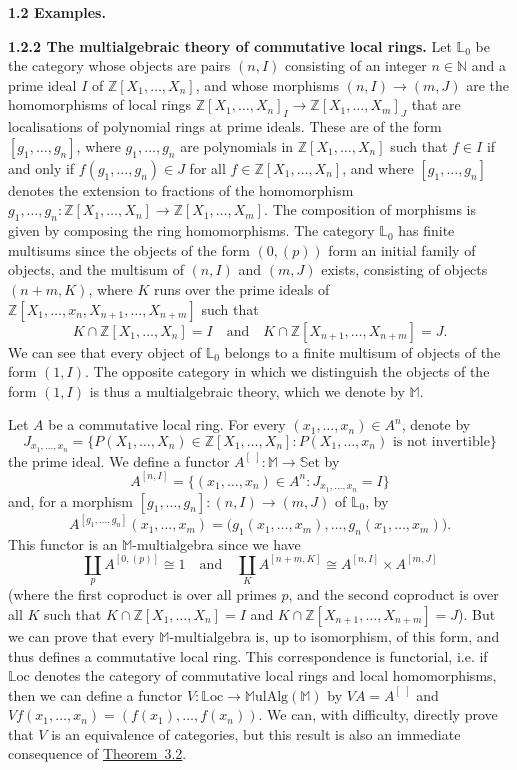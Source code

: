 \documentclass{article}
\newenvironment{rmenv}[1]
  {\phantomsection\par\medskip\noindent\textbf{#1.}\rmfamily}
  {\medskip}
\newcommand{\bb}[1]{{\mathbb{#1}}}
\newcommand{\Set}{\mathbb{S}\mathrm{et}}
\newcommand{\MulAlg}{\mathbb{M}\mathrm{ulAlg}}
\newcommand{\Loc}{\mathbb{L}\mathrm{oc}}
\newcommand{\oldpage}[1]{\marginpar{\footnotesize$\Big\vert$ \textit{p.~#1}}}
\begin{document}
\begin{rmenv}{1.2 Examples}
  \begin{rmenv}{1.2.2 The multialgebraic theory of commutative local rings}
    Let $\bb{L}_0$ be the category whose objects are pairs $(n,I)$ consisting of an integer $n\in\bb{N}$ and a prime ideal $I$ of $\bb{Z}[X_1,\ldots,X_n]$, and whose morphisms $(n,I)\to(m,J)$ are the homomorphisms of local rings $\bb{Z}[X_1,\ldots,X_n]_I\to\bb{Z}[X_1,\ldots,X_m]_J$ that are localisations of polynomial rings at prime ideals.
    These are of the form $[g_1,\ldots,g_n]$, where $g_1,\ldots,g_n$ are polynomials in $\bb{Z}[X_1,\ldots,X_n]$ such that $f\in I$ if and only if $f(g_1,\ldots,g_n)\in J$ for all $f\in\bb{Z}[X_1,\ldots,X_n]$, and where $[g_1,\ldots,g_n]$ denotes the extension to fractions of the homomorphism $g_1,\ldots,g_n\colon\bb{Z}[X_1,\ldots,X_n]\to\bb{Z}[X_1,\ldots,X_m]$.
    The composition of morphisms is given by composing the ring homomorphisms.
    The category $\bb{L}_0$ has finite multisums since the objects of the form $(0,(p))$ form an initial family of objects, and the multisum of $(n,I)$ and $(m,J)$ exists, consisting of objects $(n+m,K)$, where $K$ runs over the prime ideals of $\bb{Z}[X_1,\ldots,x_n,X_{n+1},\ldots,X_{n+m}]$ such that
    \[
      K\cap\bb{Z}[X_1,\ldots,X_n] = I
      \quad\text{and}\quad
      K\cap\bb{Z}[X_{n+1},\ldots,X_{n+m}] = J.
    \]
    We can see that every object of $\bb{L}_0$ belongs to a finite multisum of objects of the form $(1,I)$.
    The opposite category in which we distinguish the objects of the form $(1,I)$ is thus a multialgebraic theory, which we denote by $\bb{M}$.

    Let $A$ be a commutative local ring.
    For every $(x_1,\ldots,x_n)\in A^n$, denote by
    \[
      J_{x_1,\ldots,x_n} =
      \big\{
        P(X_1,\ldots,X_n)\in\bb{Z}[X_1,\ldots,X_n]
        :
        \mbox{$P(X_1,\ldots,x_n)$ is not invertible}
      \big\}
    \]
\oldpage{196}
    the prime ideal.
    We define a functor  $A^{[\,\,]}\colon\bb{M}\to\Set$ by
    \[
      A^{[n,I]}=\{(x_1,\ldots,x_n)\in A^n:J_{x_1,\ldots,x_n}=I\}
    \]
    and, for a morphism $[g_1,\ldots,g_n]\colon(n,I)\to(m,J)$ of $\bb{L}_0$, by
    \[
      A^{[g_1,\ldots,g_n]}(x_1,\ldots,x_m) =
      \big(
        g_1(x_1,\ldots,x_m),
        \ldots,
        g_n(x_1,\ldots,x_m)
      \big).
    \]
    This functor is an $\bb{M}$-multialgebra since we have
    \[
      \coprod_p A^{[0,(p)]} \cong 1
      \quad\text{and}\quad
      \coprod_K A^{[n+m,K]} \cong A^{[n,I]}\times A^{[m,J]}
    \]
    (where the first coproduct is over all primes $p$, and the second coproduct is over all $K$ such that $K\cap\bb{Z}[X_1,\ldots,X_n] = I$ and $K\cap\bb{Z}[X_{n+1},\ldots,X_{n+m}] = J$).
    But we can prove that every $\bb{M}$-multialgebra is, up to isomorphism, of this form, and thus defines a commutative local ring.
    This correspondence is functorial, i.e. if $\Loc$ denotes the category of commutative local rings and local homomorphisms, then we can define a functor $V\colon\Loc\to\MulAlg(\bb{M})$ by $VA=A^{[\,\,]}$ and $Vf(x_1,\ldots,x_n)=(f(x_1),\ldots,f(x_n))$.
    We can, with difficulty, directly prove that $V$ is an equivalence of categories, but this result is also an immediate consequence of \hyperref[theorem-3.2]{Theorem~3.2}.
  \end{rmenv}


\end{rmenv}
\end{document}
